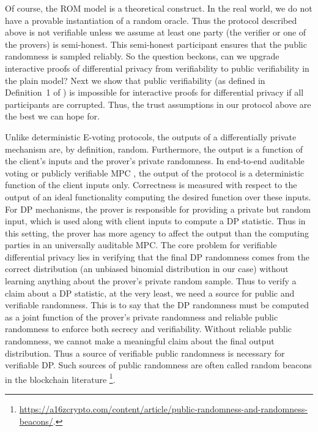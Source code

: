 Of course, the ROM model is a theoretical construct. In the real world, we do not have a provable instantiation of a random oracle. 
Thus the protocol described above is not verifiable unless we assume at least one party (the verifier or one of the provers) is semi-honest. 
This semi-honest participant ensures that the public randomness is sampled reliably.
So the question beckons, can we upgrade interactive proofs of differential privacy from verifiability to public verifiability in the plain model? Next we show that public verifiability (as defined in Definition~1 of \cite{baum2014publicly}) is impossible for interactive proofs for differential privacy if all participants are corrupted. Thus, the trust assumptions in our protocol above are the best we can hope for. 

Unlike deterministic E-voting protocols, the outputs of a differentially private mechanism are, by definition, random. 
Furthermore, the output is a function of the client's inputs and the prover's private randomness. In end-to-end auditable voting \cite{adida2008helios, harrison2022vericondor} or publicly verifiable MPC \cite{baum2014publicly}, the output of the protocol is a deterministic function of the client inputs only. 
Correctness is measured with respect to the output of an ideal functionality computing the desired function over these inputs. 
For DP mechanisms, the prover is responsible for providing a private but random input, which is used along with client inputs to compute a DP statistic. 
Thus in this setting, the prover has more agency to affect the output than the computing parties in an universally auditable MPC.
The core problem for verifiable differential privacy lies in verifying that the final DP randomness comes from the correct distribution (an unbiased binomial distribution in our case) without learning anything about the prover's private random sample. 
Thus to verify a claim about a DP statistic, at the very least, we need a source for public and verifiable randomness.
This is to say that the DP randomness must be computed as a joint function of the prover's private randomness and reliable public randomness to enforce both secrecy and verifiability. 
Without reliable public randomness, we cannot make a meaningful claim about the final output distribution.
Thus a source of verifiable public randomness is necessary for verifiable DP.  Such sources of public randomness are often called random beacons in the blockchain literature \footnote{\url{https://a16zcrypto.com/content/article/public-randomness-and-randomness-beacons/}.}.
